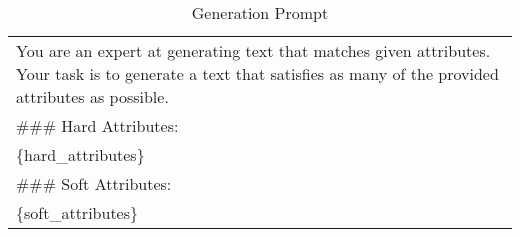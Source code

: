 \begin{table}[htbp]
    \centering
    \small
    \begin{tabular}{p{7cm}}
     \toprule
You are an expert at generating text that matches given attributes. Your task is to generate a text that satisfies as many of the provided attributes as possible. \\

\#\#\# Hard Attributes: \\
\{hard\_attributes\} \\

\#\#\# Soft Attributes: \\
\{soft\_attributes\} \\
\bottomrule
    \end{tabular}
    \caption{Generation Prompt}
    \label{tab:generation_prompt}
\end{table}